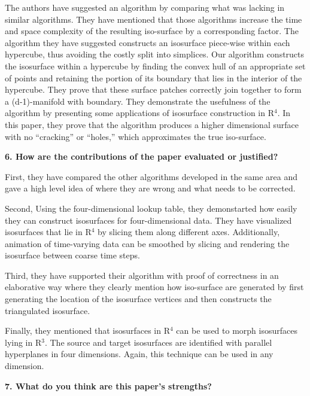 \documentclass{article}[12pt]
\begin{document}
{
    The authors have suggested an algorithm by comparing what was lacking in similar algorithms. They have mentioned that those algorithms increase the time and space complexity of the resulting iso-surface by a corresponding factor. The algorithm they have suggested constructs an isosurface piece-wise within each hypercube, thus avoiding the costly split into simplices. Our algorithm constructs the isosurface within a hypercube by finding the convex hull of an appropriate set of points and retaining the portion of its boundary that lies in the interior of the hypercube. They prove that these surface patches correctly join together to form a (d-1)-manifold with boundary. They demonstrate the usefulness of the algorithm by presenting some applications of isosurface construction in R$^{4}$.
    In this paper, they prove that the algorithm produces a higher dimensional surface with no “cracking” or “holes,” which approximates the true iso-surface.

}



\vspace{2ex}\noindent
{\bf 6. How are the contributions of the paper evaluated or justified? }

{
    First, they have compared the other algorithms developed in the same area and gave a high level idea of where they are wrong and what needs to be corrected.

    Second, Using the four-dimensional lookup table, they demonstarted how easily they can construct isosurfaces for four-dimensional data. They have visualized isosurfaces that lie in R$^{4}$ by slicing them along different axes. Additionally, animation of time-varying data can be smoothed by slicing and rendering the isosurface between coarse time steps.
    
    Third, they have supported their algorithm with proof of correctness in an elaborative way where they clearly mention how iso-surface are generated by first generating the location of the isosurface vertices and then constructs the triangulated isosurface. 

    Finally, they mentioned that isosurfaces in R$^{4}$ can be used to morph isosurfaces lying in R$^{3}$. The source and target isosurfaces are identified with parallel hyperplanes in four dimensions. Again, this technique can be used in any dimension. 
    
}



\vspace{2ex}\noindent
{\bf 7. What do you think are this paper's strengths? }
\end{document}
